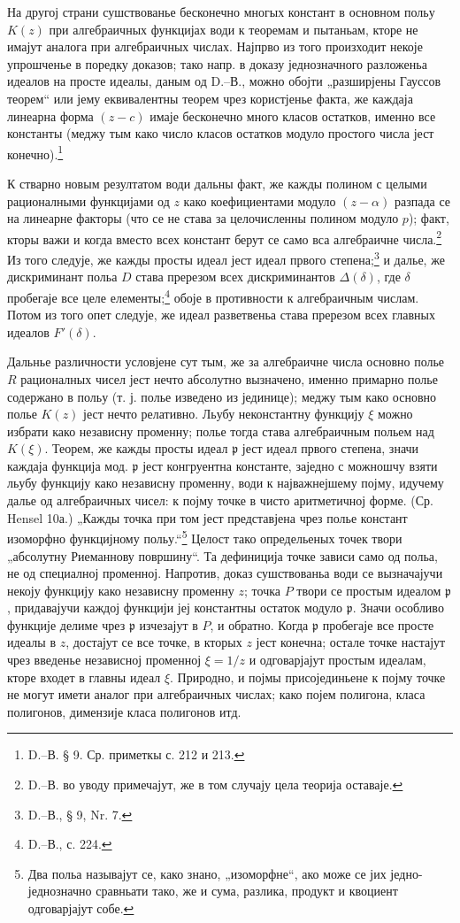 ﻿\documentclass[11pt]{article}
\providecommand{\frp}{\mathfrak p}
\begin{document}
На другој страни сушствованье бесконечно многых констант в основном польу \(K(z)\) при алгебраичных функцијах води к теоремам и пытаньам, кторе не имајут аналога при алгебраичных числах. Најпрво из того произходит некоје упрошченье в поредку доказов; тако напр. в доказу једнозначного разложеньа идеалов на просте идеалы, даным од D.--В., можно обојти „разширјены Гауссов теорем“ или јему еквивалентны теорем чрез користјенье факта, же каждаја линеарна форма \((z-c)\) имаје бесконечно много класов остатков, именно все константы (меджу тым како число класов остатков модуло простого числа јест конечно).\footnote{D.--В. § 9. Ср. приметкы с. 212 и 213.}

К стварно новым резултатом води дальны факт, же кажды полином с целыми рационалными функцијами од \(z\) како коефициентами модуло \((z-\alpha)\) разпада се на линеарне факторы (что се не става за целочисленны полином модуло \(p\)); факт, кторы важи и когда вместо всех констант берут се само вса алгебраичне числа.\footnote{D.--В. во уводу примечајут, же в том случају цела теорија оставаје.} Из того следује, же кажды просты идеал јест идеал првого степена;\footnote{D.--В., § 9, Nr. 7.} и далье, же дискриминант польа \(D\) става пререзом всех дискриминантов \(\Delta(\delta)\), где \(\delta\) пробегаје все целе елементы;\footnote{D.--В., с. 224.} обоје в противности к алгебраичным числам. Потом из того опет следује, же идеал разветвеньа става пререзом всех главных идеалов \(F'(\delta)\).

Дальнье различности условјене сут тым, же за алгебраичне числа основно полье \(R\) рационалных чисел јест нечто абсолутно вызначено, именно примарно полье содержано в польу (т. ј. полье изведено из јединице); меджу тым како основно полье \(K(z)\) јест нечто релативно. Льубу неконстантну функцију \(\xi\) можно избрати како независну променну; полье тогда става алгебраичным польем над \(K(\xi)\). Теорем, же кажды просты идеал \(\frp\) јест идеал првого степена, значи каждаја функција мод. \(\frp\) јест конгруентна константе, заједно с можношчу взяти льубу функцију како независну променну, води к најважнејшему појму, идучему далье од алгебраичных чисел: к појму точке в чисто аритметичној форме. (Ср. Hensel 10а.) „Кажды точка при том јест представјена чрез полье констант изоморфно функцијному польу.“\footnote{Два польа называјут се, како знано, „изоморфне“, ако може се јих једно-једнозначно сравньати тако, же и сума, разлика, продукт и квоциент одговарјајут собе.} Целост тако определьеных точек твори „абсолутну Риеманнову површину“. Та дефиниција точке зависи само од польа, не од специалној променној. Напротив, доказ сушствованьа води се вызначајучи некоју функцију како независну променну \(z\); точка \(P\) твори се простым идеалом \(\frp\), придавајучи каждој функцији јеј константны остаток модуло \(\frp\). Значи особливо функције делиме чрез \(\frp\) изчезајут в \(P\), и обратно. Когда \(\frp\) пробегаје все просте идеалы в \(z\), достајут се все точке, в кторых \(z\) јест конечна; остале точке настајут чрез введенье независној променној \(\xi=1/z\) и одговарјајут простым идеалам, кторе входет в главны идеал \(\xi\). Природно, и појмы присојединьене к појму точке не могут имети аналог при алгебраичных числах; како појем полигона, класа полигонов, димензије класа полигонов итд.
\end{document}
